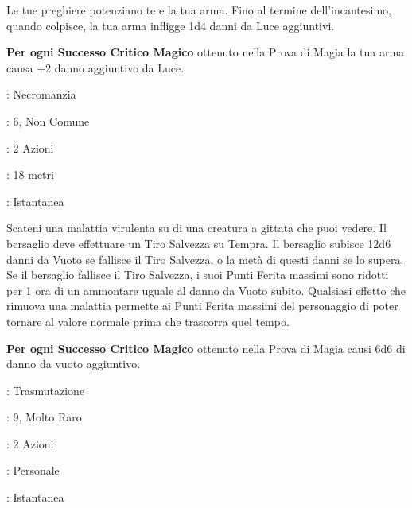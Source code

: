 \begin{multicols}{2}
Le tue preghiere potenziano te e la tua arma. Fino al termine dell'incantesimo, quando colpisce, la tua arma infligge 1d4 danni da Luce aggiuntivi.

\textbf{Per ogni Successo Critico Magico} ottenuto nella Prova di Magia la tua arma causa +2 danno aggiuntivo da Luce.

\noindent\colorbox{OBSSgold!10}{
\begin{minipage}{0.95\linewidth}
\begin{description}[noitemsep, topsep=0pt, parsep=0pt, partopsep=0pt, leftmargin=0cm, labelwidth=1.3cm]
	\item[\textbf{Lista}]: Necromanzia
	\item[\textbf{Livello}]: 6, Non Comune
	\item[\textbf{Lancio}]: 2 Azioni
	\item[\textbf{Gittata}]: 18 metri
	\item[\textbf{Durata}]: Istantanea
\end{description}
\end{minipage}}\smallskip

Scateni una malattia virulenta su di una creatura a gittata che puoi vedere. Il bersaglio deve effettuare un Tiro Salvezza su Tempra. Il bersaglio subisce 12d6 danni da Vuoto se fallisce il Tiro Salvezza, o la metà di questi danni se lo supera. Se il bersaglio fallisce il Tiro Salvezza, i suoi Punti Ferita massimi sono ridotti per 1 ora di un ammontare uguale al danno da Vuoto subito. Qualsiasi effetto che rimuova una malattia permette ai Punti Ferita massimi del personaggio di poter tornare al valore normale prima che trascorra quel tempo.

\textbf{Per ogni Successo Critico Magico} ottenuto nella Prova di Magia causi 6d6 di danno da vuoto aggiuntivo.

\noindent\colorbox{OBSSgold!10}{
\begin{minipage}{0.95\linewidth}
\begin{description}[noitemsep, topsep=0pt, parsep=0pt, partopsep=0pt, leftmargin=0cm, labelwidth=1.3cm]
	\item[\textbf{Lista}]: Trasmutazione
	\item[\textbf{Livello}]: 9, Molto Raro
	\item[\textbf{Lancio}]: 2 Azioni
	\item[\textbf{Gittata}]: Personale
	\item[\textbf{Durata}]: Istantanea
\end{description}
\end{minipage}}\smallskip


\end{multicols}
